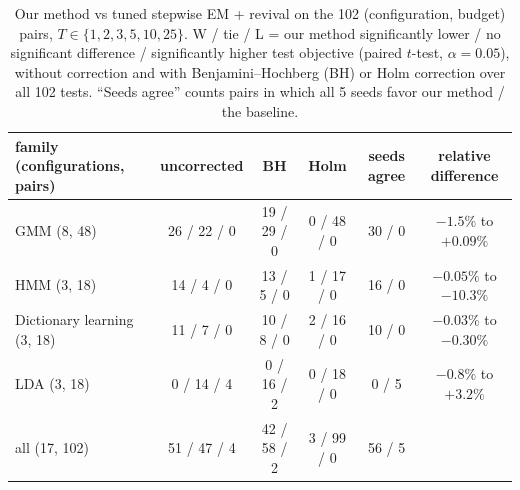 \documentclass[10pt]{article}
\begin{document}
\begin{table}[!htbp]
\centering\small
\caption{Our method vs tuned stepwise EM + revival on the 102 (configuration, budget) pairs, $T \in \{1, 2, 3, 5,
10, 25\}$. W / tie / L = our method significantly lower / no significant difference / significantly higher test
objective (paired $t$-test, $\alpha = 0.05$), without correction and with Benjamini--Hochberg (BH) or Holm
correction over all 102 tests. ``Seeds agree'' counts pairs in which all 5 seeds favor our method / the baseline.}
\label{tab:wtl}
\setlength{\tabcolsep}{4pt}
\begin{tabular}{lccccc}
\toprule
family (configurations, pairs) & uncorrected & BH & Holm & seeds agree & relative difference \\
\midrule
GMM (8, 48) & 26 / 22 / 0 & 19 / 29 / 0 & 0 / 48 / 0 & 30 / 0 & $-1.5\%$ to $+0.09\%$ \\
HMM (3, 18) & 14 / 4 / 0 & 13 / 5 / 0 & 1 / 17 / 0 & 16 / 0 & $-0.05\%$ to $-10.3\%$ \\
Dictionary learning (3, 18) & 11 / 7 / 0 & 10 / 8 / 0 & 2 / 16 / 0 & 10 / 0 & $-0.03\%$ to $-0.30\%$ \\
LDA (3, 18) & 0 / 14 / 4 & 0 / 16 / 2 & 0 / 18 / 0 & 0 / 5 & $-0.8\%$ to $+3.2\%$ \\
\midrule
all (17, 102) & 51 / 47 / 4 & 42 / 58 / 2 & 3 / 99 / 0 & 56 / 5 & \\
\bottomrule
\end{tabular}
\end{table}
\end{document}
